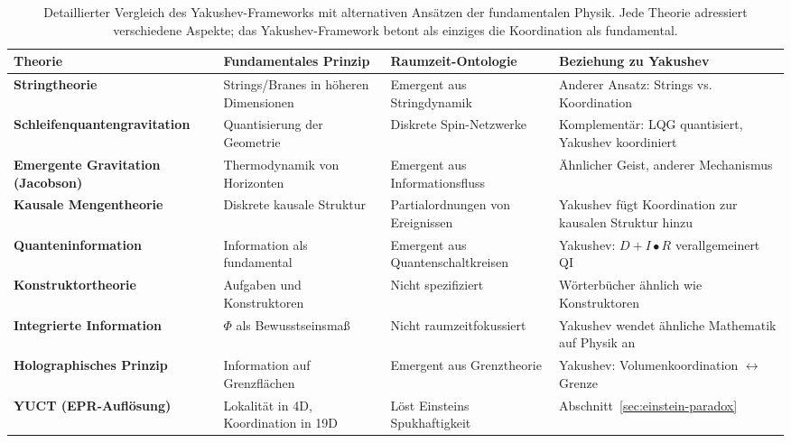 \documentclass[11pt,a4paper]{article}
\begin{document}
	\begin{table}[htbp]
		\centering
		\scriptsize
		\begin{tabular}{p{}p{}p{}p{}}
			\toprule
			\textbf{Theorie} & \textbf{Fundamentales Prinzip} & \textbf{Raumzeit-Ontologie} & \textbf{Beziehung zu Yakushev} \\
			\midrule
			\textbf{Stringtheorie} & 
			Strings/Branes in höheren Dimensionen & 
			Emergent aus Stringdynamik & 
			Anderer Ansatz: Strings vs. Koordination \\
			\hline
			\textbf{Schleifenquantengravitation} & 
			Quantisierung der Geometrie & 
			Diskrete Spin-Netzwerke & 
			Komplementär: LQG quantisiert, Yakushev koordiniert \\
			\hline
			\textbf{Emergente Gravitation (Jacobson)} & 
			Thermodynamik von Horizonten & 
			Emergent aus Informationsfluss & 
			Ähnlicher Geist, anderer Mechanismus \\
			\hline
			\textbf{Kausale Mengentheorie} & 
			Diskrete kausale Struktur & 
			Partialordnungen von Ereignissen & 
			Yakushev fügt Koordination zur kausalen Struktur hinzu \\
			\hline
			\textbf{Quanteninformation} & 
			Information als fundamental & 
			Emergent aus Quantenschaltkreisen & 
			Yakushev: $D+I•R$ verallgemeinert QI \\
			\hline
			\textbf{Konstruktortheorie} & 
			Aufgaben und Konstruktoren & 
			Nicht spezifiziert & 
			Wörterbücher ähnlich wie Konstruktoren \\
			\hline
			\textbf{Integrierte Information} & 
			$\Phi$ als Bewusstseinsmaß & 
			Nicht raumzeitfokussiert & 
			Yakushev wendet ähnliche Mathematik auf Physik an \\
			\hline
			\textbf{Holographisches Prinzip} & 
			Information auf Grenzflächen & 
			Emergent aus Grenztheorie & 
			Yakushev: Volumenkoordination $\leftrightarrow$ Grenze \\
			\hline
			\textbf{YUCT (EPR-Auflösung)} & 
			Lokalität in 4D, Koordination in 19D & 
			Löst Einsteins Spukhaftigkeit & 
			Abschnitt~\ref{sec:einstein-paradox} \\
			\bottomrule
		\end{tabular}
		\caption{Detaillierter Vergleich des Yakushev-Frameworks mit alternativen Ansätzen der fundamentalen Physik. Jede Theorie adressiert verschiedene Aspekte; das Yakushev-Framework betont als einziges die Koordination als fundamental.}
	\end{table}
	
\end{document}
